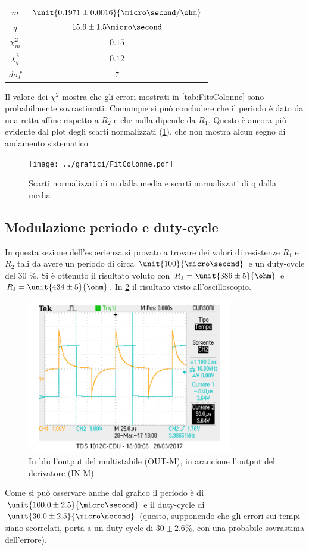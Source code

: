 \documentclass[a4paper,10pt]{article}
\begin{document}
\begin{table}[H]
\centering
\begin{tabular}{c|c} 
$m$ & $\unit{0.1971 \pm 0.0016}{\micro\second/\ohm} $\\
$q$ & ${15.6 \pm 1.5}{\micro\second}$\\
$\chi^2_m$ & $0.15$\\
$\chi^2_q$ & $0.12$\\
$dof$ & $7$\\
\end{tabular}
\label{tab:resColonna}
\end{table}



Il valore dei $\chi^2$ mostra che gli errori mostrati in \cref{tab:FitsColonne} sono probabilmente sovrastimati. Comunque si può concludere che il periodo è dato da una retta affine rispetto a $R_2$ e che nulla dipende da $R_1$. Questo è ancora più evidente dal plot degli scarti normalizzati (\cref{fig:FitColonne}), che non mostra alcun segno di andamento sistematico.

 
\begin{figure}[H]
	\centering
	\texttt{[image: ../grafici/FitColonne.pdf]}
	\caption{Scarti normalizzati di m dalla media e scarti normalizzati di q dalla media}
	\label{fig:FitColonne}
\end{figure}

\subsection{Modulazione periodo e duty-cycle}

In questa sezione dell'esperienza si provato a trovare dei valori di resistenze $R_1$ e $R_2$ tali da avere un periodo di circa $\unit{100}{\micro\second}$ e un duty-cycle del 30 \%. Si è ottenuto il risultato voluto con $R_1=\unit{386 \pm 5}{\ohm}$ e  $R_1=\unit{434 \pm 5}{\ohm}$. In \cref{fig:410030} il risultato visto all'oscilloscopio. 


 \begin{figure}[H]
	\centering
	\includegraphics[width=0.8\textwidth]{../grafici/410030.png}
	\caption{In blu l'output del multistabile (OUT-M), in arancione l'output del derivatore (IN-M)}
	\label{fig:410030}
\end{figure}

Come si può osservare anche dal grafico il periodo è di $\unit{100.0 \pm 2.5}{\micro\second}$ e il duty-cycle di $\unit{30.0 \pm 2.5}{\micro\second}$ (questo, supponendo che gli errori sui tempi siano scorrelati, porta a un duty-cycle di $30 \pm 2.6 \% $, con una probabile sovrastima dell'errore).
\end{document}
